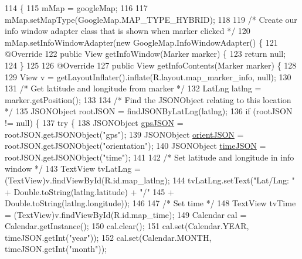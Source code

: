 \begin{DoxyCode}
114                                                 \{
115         mMap = googleMap;
116 
117         mMap.setMapType(GoogleMap.MAP\_TYPE\_HYBRID);
118 
119         \textcolor{comment}{/* Create our info window adapter class that is shown when marker clicked */}
120         mMap.setInfoWindowAdapter(\textcolor{keyword}{new} GoogleMap.InfoWindowAdapter() \{
121             @Override
122             \textcolor{keyword}{public} View getInfoWindow(Marker marker) \{
123                 \textcolor{keywordflow}{return} null;
124             \}
125 
126             @Override
127             \textcolor{keyword}{public} View getInfoContents(Marker marker) \{
128 
129                 View v =  getLayoutInflater().inflate(R.layout.map\_marker\_info, null);
130 
131                 \textcolor{comment}{/* Get latitude and longitude from marker */}
132                 LatLng latlng = marker.getPosition();
133 
134                 \textcolor{comment}{/* Find the JSONObject relating to this location */}
135                 JSONObject rootJSON = findJSONByLatLng(latlng);
136                 \textcolor{keywordflow}{if} (rootJSON != null) \{
137                     \textcolor{keywordflow}{try} \{
138                         JSONObject \hyperlink{logging-device_8ino_a548727e041a5cd3db91bdbd0ccd71e30}{gpsJSON} = rootJSON.getJSONObject(\textcolor{stringliteral}{"gps"});
139                         JSONObject \hyperlink{logging-device_8ino_ae8e95a76df2aaa373792e5b744a6bb73}{orientJSON} = rootJSON.getJSONObject(\textcolor{stringliteral}{"orientation"});
140                         JSONObject \hyperlink{logging-device_8ino_acc172a29cb5ff709b48b650d9fb6503c}{timeJSON} = rootJSON.getJSONObject(\textcolor{stringliteral}{"time"});
141 
142                         \textcolor{comment}{/* Set latitude and longitude in info window */}
143                         TextView tvLatLng = (TextView)v.findViewById(R.id.map\_latlng);
144                         tvLatLng.setText(\textcolor{stringliteral}{"Lat/Lng: "} + Double.toString(latlng.latitude) + \textcolor{stringliteral}{"/"}
145                                 + Double.toString(latlng.longitude));
146 
147                         \textcolor{comment}{/* Set time */}
148                         TextView tvTime = (TextView)v.findViewById(R.id.map\_time);
149                         Calendar cal = Calendar.getInstance();
150                         cal.clear();
151                         cal.set(Calendar.YEAR, timeJSON.getInt(\textcolor{stringliteral}{"year"}));
152                         cal.set(Calendar.MONTH, timeJSON.getInt(\textcolor{stringliteral}{"month"}));

\end{DoxyCode}
